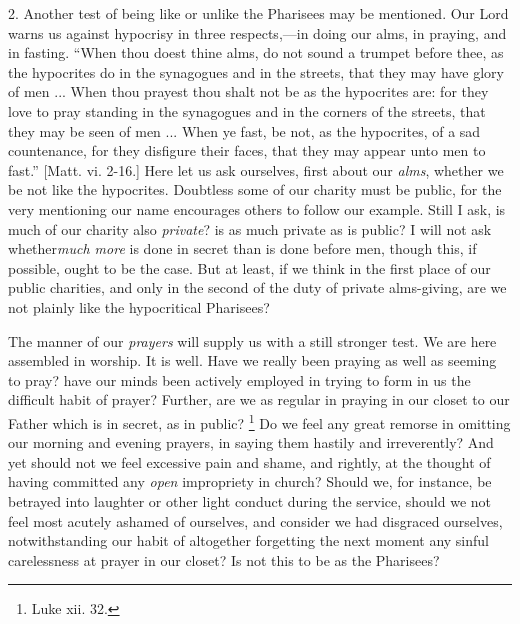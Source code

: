 2. Another test of being like or unlike the Pharisees
may be mentioned. Our Lord warns us against hypocrisy in
three respects,—in doing our alms, in praying, and
in fasting. ``When thou doest thine alms, do not
sound a trumpet before thee, as the hypocrites do in the
synagogues and in the streets, that they may have glory
of men ... When thou prayest thou shalt not be as the
hypocrites are: for they love to pray standing in the
synagogues and in the corners of the streets, that they
may be seen of men ... When ye fast, be not, as the
hypocrites, of a sad countenance, for they disfigure
their faces, that they may appear unto men to fast.''
[Matt. vi. 2-16.] Here let us ask ourselves, first about our \emph{alms},
whether we be not like the hypocrites. Doubtless some of
our charity must be public, for the very mentioning our
name encourages others to follow our example. Still I
ask, is much of our charity also \emph{private}? is as
much private as is public? I will not ask whether\emph{much
more} is done in secret than is done before men,
though this, if possible, ought to be the case. But at
least, if we think in the first place of our public
charities, and only in the second of the duty of private
alms-giving, are we not plainly like the hypocritical
Pharisees?

The manner of our \emph{prayers} will supply us with a
still stronger test. We are here assembled in worship. It
is well. Have we really been praying as well as seeming
to pray? have our minds been actively employed in trying
to form in us the difficult habit of prayer? Further, are
we as regular in praying in our closet to our Father
which is in secret, as in public? \footnote{Luke
xii. 32.} Do we
feel any great remorse in omitting our morning and
evening prayers, in saying them hastily and irreverently?
And yet should not we feel excessive pain and shame, and
rightly, at the thought of having committed any \emph{open}
impropriety in church? Should we, for instance, be
betrayed into laughter or other light conduct during the
service, should we not feel most acutely ashamed of
ourselves, and consider we had disgraced ourselves,
notwithstanding our habit of altogether forgetting the
next moment any sinful carelessness at prayer in our
closet? Is not this to be as the Pharisees?

